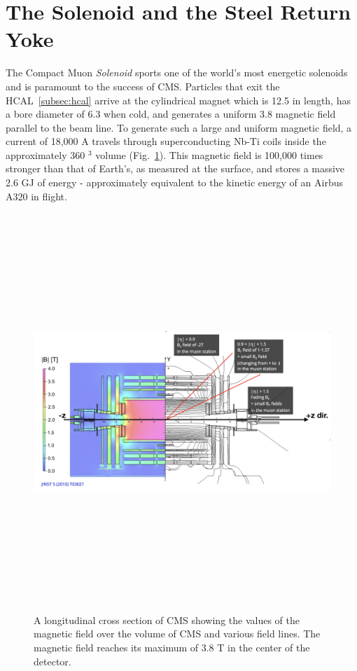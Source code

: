 \section{The Solenoid and the Steel Return Yoke}
\label{sec:solenoid}

The Compact Muon \emph{Solenoid} sports one of the world's most energetic solenoids and is paramount to the success of CMS.
Particles that exit the HCAL~\ref{subsec:hcal} arrive at the cylindrical magnet which is 12.5 \meter in length, has a bore diameter of 6.3 \meter when cold, and generates a uniform 3.8 \tesla magnetic field parallel to the beam line.
To generate such a large and uniform magnetic field, a current of 18,000 A travels through superconducting Nb-Ti coils inside the approximately 360 \meter$^3$ volume (Fig.~\ref{fig:cms_magnetic_field}).
This magnetic field is 100,000 times stronger than that of Earth's, as measured at the surface, and stores a massive 2.6 GJ of energy - approximately equivalent to the kinetic energy of an Airbus A320 in flight.
\begin{figure}[pbth]
    \centering
    \includegraphics[width=15cm,height=15cm,keepaspectratio]{figures/cms/solenoid/CMS_longitudinal_view_magnetic_field.png}
        \caption{
        A longitudinal cross section of CMS showing the values of the magnetic field over the volume of CMS and various field lines. 
        The magnetic field reaches its maximum of 3.8 T in the center of the detector.}
        \label{fig:cms_magnetic_field}
    \end{figure}


